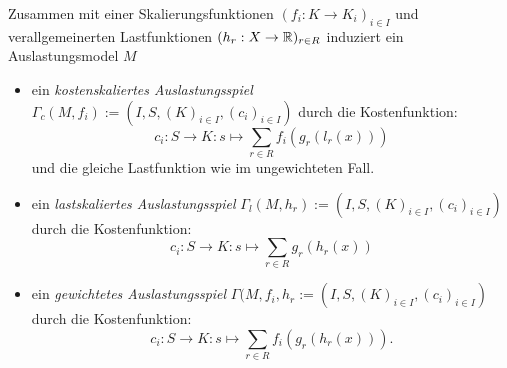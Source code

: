 \begin{defn}\label{def:skalierteAuslastungsspiel}
	Zusammen mit einer Skalierungsfunktionen $(f_i: K \to K_i)_{i\in I}$ und verallgemeinerten Lastfunktionen $(h_r: X \to \mathbb{R})_{r\in R}$ induziert ein Auslastungsmodel $M$ 
	\begin{itemize}
		\item ein \emph{kostenskaliertes Auslastungsspiel} $\Gamma_c(M, f_i) := (I, S, (K)_{i\in I}, (c_i)_{i \in I})$ durch die Kostenfunktion:
		\[c_i: S \to K: s \mapsto \sum_{r \in R} f_i(g_r(l_r(x))) \]
		und die gleiche Lastfunktion wie im ungewichteten Fall.
		\item ein \emph{lastskaliertes Auslastungsspiel} $\Gamma_l(M, h_r) := (I, S, (K)_{i\in I}, (c_i)_{i \in I})$ durch die Kostenfunktion:
		\[c_i: S \to K: s \mapsto \sum_{r \in R} g_r(h_r(x)) \]
		\item ein \emph{gewichtetes Auslastungsspiel} $\Gamma(M, f_i, h_r := (I, S, (K)_{i\in I}, (c_i)_{i \in I})$ durch die Kostenfunktion:
		\[c_i: S \to K: s \mapsto \sum_{r \in R} f_i(g_r(h_r(x))).\]
	\end{itemize}	
\end{defn}
